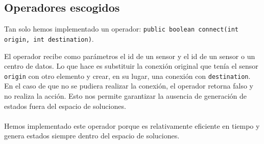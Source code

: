 \subsection{Operadores escogidos}

Tan solo hemos implementado un operador: 
\texttt{public boolean connect(int origin, int destination)}.

El operador recibe como parámetros el id de un sensor y el id de un sensor
o un centro de datos.
Lo que hace es substituir la conexión original que tenía el sensor 
\texttt{origin} con otro elemento y crear, en su lugar, una conexión con
\texttt{destination}. En el caso de que no se pudiera realizar la conexión,
el operador retorna falso y no realiza la acción. Esto nos permite garantizar
la ausencia de generación de estados fuera del espacio de soluciones.

\paragraph{}

Hemos implementado este operador porque es relativamente eficiente en tiempo
y genera estados siempre dentro del espacio de soluciones.
